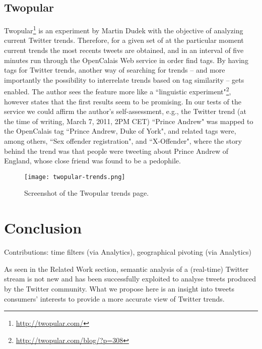 \documentclass[runningheads,a4paper]{llncs}
\begin{document}
\subsection{Twopular}
Twopular\footnote{\url{http://twopular.com/}} is an experiment by Martin Dudek with the objective of analyzing current Twitter trends. Therefore, for a given set of at the particular moment current trends the most recents tweets are obtained, and in an interval of five minutes run through the OpenCalais Web service in order find tags. By having tags for Twitter trends, another way of searching for trends -- and more importantly the possibility to interrelate trends based on tag similarity -- gets enabled. The author sees the feature more like a ``linguistic experiment"\footnote{\url{http://twopular.com/blog/?p=308}}, however states that the first results seem to be promising. In our tests of the service we could affirm the author's self-assessment, e.g., the Twitter trend (at the time of writing, March 7, 2011, 2PM CET) ``Prince Andrew" was mapped to the OpenCalais tag ``Prince Andrew, Duke of York", and related tags were, among others,  ``Sex offender registration", and ``X-Offender", where the story behind the trend was that people were tweeting about Prince Andrew of England, whose close friend was found to be a pedophile.

\begin{figure}[h!]
  \centering
  \texttt{[image: twopular-trends.png]}
  \caption{Screenshot of the Twopular trends page.}
  \label{fig:dataflow}
\end{figure}

\section{Conclusion}
Contributions: time filters (via Analytics), geographical pivoting (via Analytics)

As seen in the Related Work section, semantic analysis of a (real-time) Twitter stream is not new and has been successfully exploited to analyse tweets produced by the Twitter community.
What we propose here is an insight into tweets consumers' interests to provide a more accurate view of Twitter trends.




\end{document}
